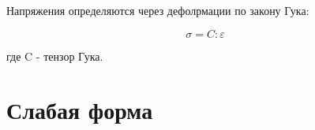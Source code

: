 \documentclass[a4paper,12pt]{article}
\begin{document}
Напряжения определяются через дефолрмации по закону Гука:

\begin{equation}
    \sigma = C : \varepsilon
\end{equation} 

где C - тензор Гука.

\section{Слабая форма}
% 
% 
\end{document}
